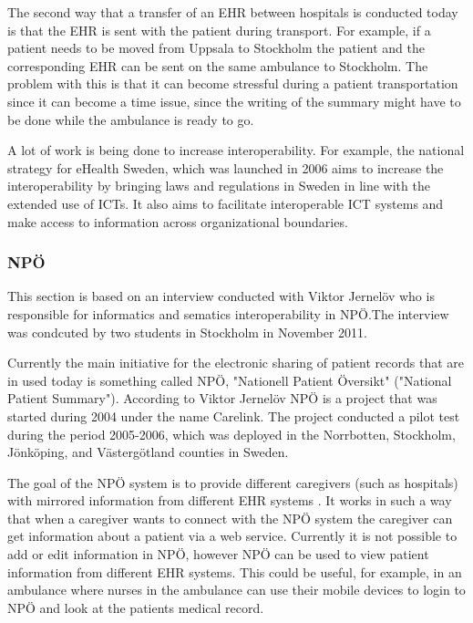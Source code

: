 \documentclass[14pt]{article}
\begin{document}
The second way that a transfer of an \gls{EHR} between hospitals is conducted today is that the \gls{EHR} is sent with the patient during transport. For example, if a patient needs to be moved from Uppsala to Stockholm the patient and the corresponding \gls{EHR} can be sent on the same ambulance to Stockholm. The problem with this is that it can become stressful during a patient transportation since it can become a time issue, since the writing of the summary might have to be done while the ambulance is ready to go.


A lot of work is being done to increase \gls{interoperability}. For example, the national strategy for eHealth Sweden, which was launched in 2006 aims to increase the interoperability by bringing laws and regulations in Sweden in line with the extended use of \glspl{ICT}. It also aims to facilitate interoperable \gls{ICT} systems and make access to information across organizational boundaries. \cite{NationalStrategy} 

\subsubsection{NPÖ} %
\label{sec:npoInterv}
This section is based on an interview conducted with Viktor Jernelöv who is responsible for informatics and sematics interoperability in NPÖ.The interview was condcuted by two students in Stockholm in November 2011. 

Currently the main initiative for the electronic sharing of patient records that are in used today is something called NPÖ, "Nationell Patient Översikt" ("National Patient Summary"). According to Viktor Jernelöv \cite {ViktorJernelov} NPÖ is a project that was started during 2004 under the name Carelink. The project conducted a pilot test during the period 2005-2006, which was deployed in the Norrbotten, Stockholm, Jönköping, and Västergötland counties in Sweden.

The goal of the NPÖ system is to provide different caregivers (such as hospitals) with mirrored information from different \gls{EHR} systems \cite{ViktorJernelov}. It works in such a way that when a caregiver wants to connect with the NPÖ system the caregiver can get information about a patient via a web service. Currently it is not possible to add or edit information in NPÖ, however NPÖ can be used to view patient information from different \gls{EHR} systems. This could be useful, for example, in an ambulance where nurses in the ambulance can use their mobile devices to login to NPÖ and look at the patients medical record.  
\end{document}

